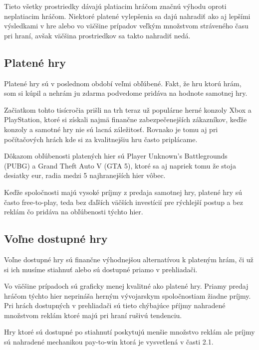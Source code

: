 \documentclass[10pt,twoside,slovak,a4paper]{article}
\begin{document}
Tieto všetky prostriedky dávajú platiacim hráčom značnú výhodu oproti neplatiacim hráčom. Niektoré platené vylepšenia sa dajú nahradiť ako aj lepšími výsledkami v hre alebo vo väčšine prípadov  veľkým množstvom stráveného času pri hraní, avšak väčšina prostriedkov sa takto nahradiť nedá. 



\subsection{Platené hry} 

Platené hry sú v poslednom období veľmi obľúbené. Fakt, že hru ktorú hrám, som si kúpil a nehrám ju zdarma podvedome pridáva na hodnote samotnej hry. 

Začiatkom tohto tisícročia prišli na trh teraz už populárne herné konzoly Xbox a PlayStation, ktoré si získali najmä finančne zabezpečenejších zákazníkov, keďže konzoly a samotné hry nie sú lacná záležitosť. Rovnako je tomu aj pri počítačových hrách kde si za kvalitnejšiu hru často priplácame. 

Dôkazom obľúbenosti platených hier sú Player Unknown’s Battlegrounds (PUBG) a Grand Theft Auto V (GTA 5), ktoré sa aj napriek tomu že stoja desiatky eur, radia medzi 5 najhranejších hier vôbec. 

Keďže spoločnosti majú vysoké príjmy z predaja samotnej hry, platené hry sú často free-to-play, teda bez ďaľších väčších investícií pre rýchlejší postup a bez reklám čo pridáva na obľúbenosti týchto hier.



\subsection{Voľne dostupné hry} 

Voľne dostupné hry sú finančne výhodnejšou alternatívou k plateným hrám, či už si ich musíme stiahnuť alebo sú dostupné priamo v prehliadači. 

Vo väčšine prípadoch sú graficky menej kvalitné ako platené hry. Priamy predaj hráčom týchto hier neprináša herným vývojarskym spoločnostiam žiadne príjmy. 
Pri hrách dostupných v prehliadači sú tieto chýbajúce pŕíjmy nahradené množstvom reklám ktoré majú pri hraní rušivú tendenciu.

Hry ktoré sú dostupné po stiahnutí poskytujú menšie množstvo reklám ale príjmy sú nahradené mechanikou pay-to-win ktorá je vysvetlená v časti 2.1.
\end{document}
